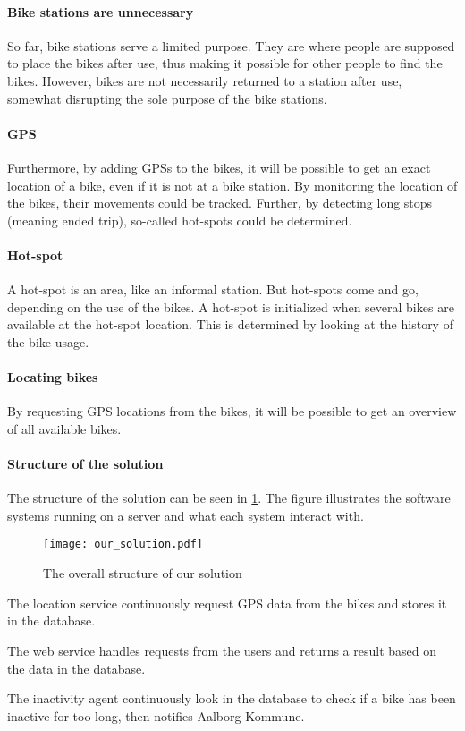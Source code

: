 \paragraph{Bike stations are unnecessary}
So far, bike stations serve a limited purpose.
They are where people are supposed to place the bikes after use, thus making it possible for other people to find the bikes.
However, bikes are not necessarily returned to a station after use, somewhat disrupting the sole purpose of the bike stations.

\paragraph{GPS}
Furthermore, by adding GPSs to the bikes, it will be possible to get an exact location of a bike, even if it is not at a bike station.
By monitoring the location of the bikes, their movements could be tracked.
Further, by detecting long stops (meaning ended trip), so-called hot-spots could be determined.

\paragraph{Hot-spot}
A hot-spot is an area, like an informal station.
But hot-spots come and go, depending on the use of the bikes.
A hot-spot is initialized when several bikes are available at the hot-spot location.
This is determined by looking at the history of the bike usage.

\paragraph{Locating bikes}
By requesting GPS locations from the bikes, it will be possible to get an overview of all available bikes.

\paragraph{Structure of the solution}
The structure of the solution can be seen in \cref{fig:solution_structure}.
The figure illustrates the software systems running on a server and what each system interact with.
 
\begin{figure}[H]
\texttt{[image: our\_solution.pdf]}
\caption{The overall structure of our solution}
\label{fig:solution_structure}
\end{figure}

The location service continuously request GPS data from the bikes and stores it in the database.

The web service handles requests from the users and returns a result based on the data in the database.

The inactivity agent continuously look in the database to check if a bike has been inactive for too long, then notifies Aalborg Kommune.
